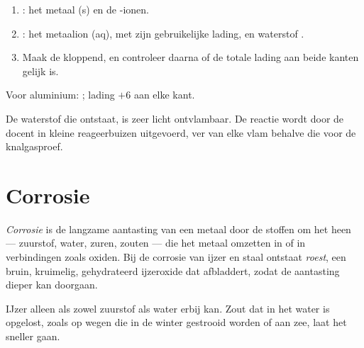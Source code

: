 \begin{method}\label{met:g9:metals-acids-corrosion:write}
\begin{enumerate}
  \item {}: het metaal (s) en de -ionen.
  \item {}: het metaalion (aq), met zijn gebruikelijke
        lading, en waterstof .
  \item Maak de  kloppend, en controleer daarna of de totale lading
        aan beide kanten gelijk is.
\end{enumerate}
Voor aluminium: ; lading
$+6$ aan elke kant.
\end{method}

\begin{safety}{}
De waterstof die ontstaat, is zeer licht ontvlambaar. De reactie wordt
door de docent in kleine reageerbuizen uitgevoerd, ver van elke vlam
behalve die voor de knalgasproef.
\end{safety}

\section{Corrosie}

\begin{definition}\label{def:g9:metals-acids-corrosion:corrosion}
\emph{Corrosie} is de langzame aantasting van een metaal
door de stoffen om het heen --- zuurstof, water, zuren, zouten --- die het
metaal omzetten in  of in verbindingen zoals oxiden. Bij de
corrosie van ijzer en staal ontstaat \emph{roest}, een
bruin, kruimelig, gehydrateerd ijzeroxide dat afbladdert, zodat de
aantasting dieper kan doorgaan.
\end{definition}

\begin{proposition}\label{prop:g9:metals-acids-corrosion:needs}
IJzer  alleen als zowel zuurstof als water erbij kan. Zout dat in
het water is opgelost, zoals op wegen die in de winter gestrooid worden
of aan zee, laat het  sneller gaan.
\end{proposition}

